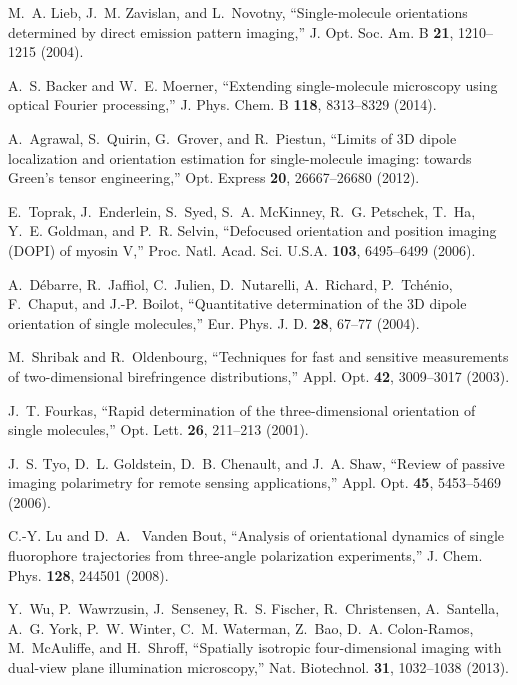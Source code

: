 \documentclass[10pt]{article}
\begin{document}
\begin{thebibliography}{10}
M.~A. Lieb, J.~M. Zavislan, and L.~Novotny, \enquote{Single-molecule
  orientations determined by direct emission pattern imaging,} J. Opt. Soc. Am.
  B \textbf{21}, 1210--1215 (2004).

A.~S. Backer and W.~E. Moerner, \enquote{Extending single-molecule microscopy
  using optical {F}ourier processing,} J. Phys. Chem. B \textbf{118},
  8313--8329 (2014).

A.~Agrawal, S.~Quirin, G.~Grover, and R.~Piestun, \enquote{Limits of 3{D}
  dipole localization and orientation estimation for single-molecule imaging:
  towards {G}reen's tensor engineering,} Opt. Express \textbf{20}, 26667--26680
  (2012).

E.~Toprak, J.~Enderlein, S.~Syed, S.~A. McKinney, R.~G. Petschek, T.~Ha, Y.~E.
  Goldman, and P.~R. Selvin, \enquote{Defocused orientation and position
  imaging ({DOPI}) of myosin {V},} Proc. Natl. Acad. Sci. U.S.A. \textbf{103}, 6495--6499 (2006).

A.~D{\'e}barre, R.~Jaffiol, C.~Julien, D.~Nutarelli, A.~Richard,
  P.~Tch{\'e}nio, F.~Chaput, and J.-P. Boilot, \enquote{Quantitative
  determination of the 3{D} dipole orientation of single molecules,} Eur. Phys.
  J. D. \textbf{28}, 67--77 (2004).

M.~Shribak and R.~Oldenbourg, \enquote{Techniques for fast and sensitive
  measurements of two-dimensional birefringence distributions,} Appl. Opt.
  \textbf{42}, 3009--3017 (2003).

J.~T. Fourkas, \enquote{Rapid determination of the three-dimensional
  orientation of single molecules,} Opt. Lett. \textbf{26}, 211--213 (2001).

J.~S. Tyo, D.~L. Goldstein, D.~B. Chenault, and J.~A. Shaw, \enquote{Review of
  passive imaging polarimetry for remote sensing applications,} Appl. Opt.
  \textbf{45}, 5453--5469 (2006).

C.-Y. Lu and D.~A.~\hypertarget{vanden}{{\color{urlblue} Vanden}} Bout, \enquote{Analysis of orientational dynamics of
  single fluorophore trajectories from three-angle polarization experiments,}
  J. Chem. Phys. \textbf{128}, 244501 (2008).

Y.~Wu, P.~Wawrzusin, J.~Senseney, R.~S. Fischer, R.~Christensen, A.~Santella,
  A.~G. York, P.~W. Winter, C.~M. Waterman, Z.~Bao, D.~A. Colon-Ramos,
  M.~McAuliffe, and H.~Shroff, \enquote{Spatially isotropic four-dimensional
  imaging with dual-view plane illumination microscopy,} Nat. Biotechnol.
  \textbf{31}, 1032--1038 (2013).


\end{thebibliography}
\end{document}
